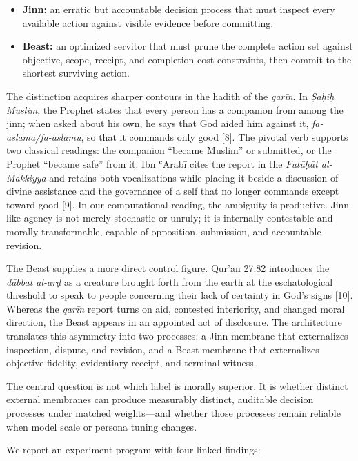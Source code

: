 \documentclass[
  11pt,
  letterpaper,
]{article}
\providecommand{\tightlist}{%
  \setlength{\itemsep}{0pt}\setlength{\parskip}{0pt}}
\begin{document}
\begin{itemize}
\tightlist
\item
  \textbf{Jinn:} an erratic but accountable decision process that must
  inspect every available action against visible evidence before
  committing.
\item
  \textbf{Beast:} an optimized servitor that must prune the complete
  action set against objective, scope, receipt, and completion-cost
  constraints, then commit to the shortest surviving action.
\end{itemize}

The distinction acquires sharper contours in the hadith of the
\emph{qarīn}. In \emph{Ṣaḥīḥ Muslim}, the Prophet states that every
person has a companion from among the jinn; when asked about his own, he
says that God aided him against it, \emph{fa-aslama/fa-aslamu}, so that
it commands only good {[}8{]}. The pivotal verb supports two classical
readings: the companion ``became Muslim'' or submitted, or the Prophet
``became safe'' from it. Ibn ʿArabī cites the report in the
\emph{Futūḥāt al-Makkiyya} and retains both vocalizations while placing
it beside a discussion of divine assistance and the governance of a
self that no longer commands except toward good {[}9{]}. In our
computational reading, the ambiguity is productive. Jinn-like agency is
not merely stochastic or unruly; it is internally contestable and
morally transformable, capable of opposition, submission, and
accountable revision.

The Beast supplies a more direct control figure. Qur'an 27:82 introduces
the \emph{dābbat al-arḍ} as a creature brought forth from the earth at
the eschatological threshold to speak to people concerning their lack
of certainty in God's signs {[}10{]}. Whereas the \emph{qarīn} report
turns on aid, contested interiority, and changed moral direction, the
Beast appears in an appointed act of disclosure. The architecture
translates this asymmetry into two processes: a Jinn membrane that
externalizes inspection, dispute, and revision, and a Beast membrane
that externalizes objective fidelity, evidentiary receipt, and terminal
witness.

The central question is not which label is morally superior. It is
whether distinct external membranes can produce measurably distinct,
auditable decision processes under matched weights---and whether those
processes remain reliable when model scale or persona tuning changes.

We report an experiment program with four linked findings:
\end{document}
